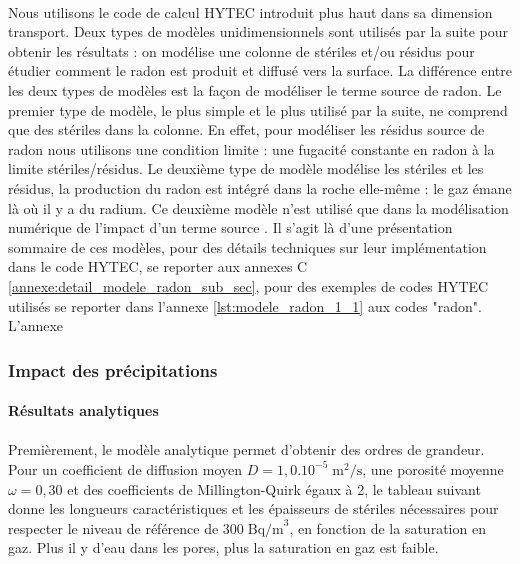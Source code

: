 \documentclass{article}
\begin{document}
\paragraph{} Nous utilisons le code de calcul HYTEC introduit plus haut dans sa dimension transport. Deux types de modèles unidimensionnels sont utilisés par la suite pour obtenir les résultats : on modélise une colonne de stériles et/ou résidus pour étudier comment le radon est produit et diffusé vers la surface. La différence entre les deux types de modèles est la façon de modéliser le terme source de radon. Le premier type de modèle, le plus simple et le plus utilisé par la suite, ne comprend que des stériles dans la colonne. En effet, pour modéliser les résidus source de radon nous utilisons une condition limite : une fugacité constante en radon à la limite stériles/résidus. Le deuxième type de modèle modélise les stériles et les résidus, la production du radon est intégré dans la roche elle-même : le gaz émane là où il y a du radium. Ce deuxième modèle n'est utilisé que dans la modélisation numérique de l'impact d'un terme source . Il s’agit là d’une présentation sommaire de ces modèles, pour des détails techniques sur leur implémentation dans le code HYTEC, se reporter aux annexes C  \ref{annexe:detail_modele_radon_sub_sec}, pour des exemples de codes HYTEC utilisés se reporter dans l'annexe \ref{lst:modele_radon_1_1} aux codes "radon". L'annexe

\subsubsection{Impact des précipitations}

\paragraph{Résultats analytiques}

\paragraph{} Premièrement, le modèle analytique permet d'obtenir des ordres de grandeur. Pour un coefficient de diffusion moyen $D=1,0.10^{-5} \; \text{m}^2/\text{s}$, une porosité moyenne $\omega=0,30$ et des coefficients de Millington-Quirk égaux à 2, le tableau suivant donne les longueurs caractéristiques et les épaisseurs de stériles nécessaires pour respecter le niveau de référence de $300\; \text{Bq/m}^3$, en fonction de la saturation en gaz. Plus il y d’eau dans les pores, plus la saturation en gaz est faible.
\end{document}
